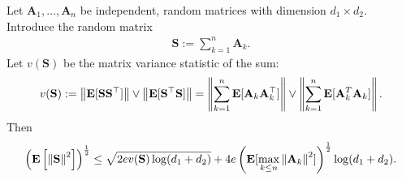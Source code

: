 \begin{ftheorem}
  Let $\mathbf{A}_1, \ldots, \mathbf{A}_n$ be independent, random matrices with dimension 
  $d_1 \times d_2$.
    Introduce the random matrix
      \begin{gather*}
        \mathbf{S}:=\sum_{k=1}^n \mathbf{A}_k.
      \end{gather*}
    Let $v(\mathbf{S})$ be the matrix variance statistic of the sum:
      \begin{align}
        \label{rmineq_bernstein_cond_2}
        v(\mathbf{S}):= \left\lVert\mathbf{E}[\mathbf{S}\mathbf{S}^\top ]\right\rVert \lor \left\lVert\mathbf{E}[\mathbf{S}^\top \mathbf{S}]\right\rVert 
             = \left\lVert\sum_{k=1}^n\mathbf{E}[\mathbf{A}_k\mathbf{A}_k^\top]\right\rVert \lor \left\lVert\sum_{k=1}^n\mathbf{E}[\mathbf{A}_k^T \mathbf{A}_k]\right\rVert .
      \end{align}
    Then
      \begin{align}
        \label{rmineq_bernstein_expectation_bound}
        \left(
          \mathbf{E} \left[ \left\lVert\mathbf{S}\right\rVert^2 \right]
        \right)^{\frac{1}{2}}
        \le
        \sqrt{
          2ev(\mathbf{S})\log(d_1+d_2)
        } 
        + 
        4e \left( 
          \mathbf{E}[\max_{k \le n}\left\lVert\mathbf{A}_k\right\rVert^2]
        \right)^\frac{1}{2}
        \log(d_1+d_2).
      \end{align}
\end{ftheorem}
  
